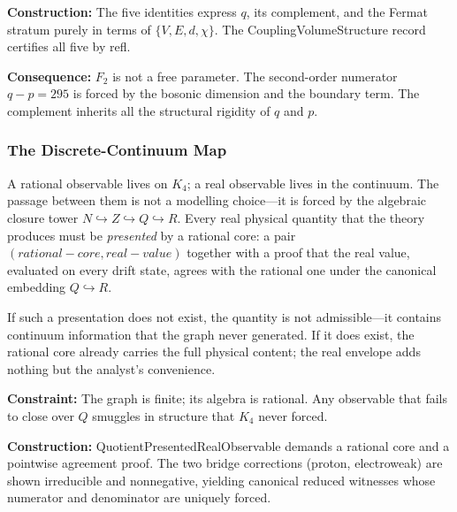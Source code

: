 \documentclass[11pt,a4paper]{book}
\def\mathbb#1{#1}%
\def\texttt#1{#1}%
\begin{document}
\textbf{Construction:}
The five identities express $q$, its complement, and the Fermat
stratum purely in terms of $\{V, E, d, \chi\}$.  The
\texttt{CouplingVolumeStructure} record certifies all five by
\texttt{refl}.

\textbf{Consequence:}
$F_2$ is not a free parameter.  The second-order numerator $q - p = 295$
is forced by the bosonic dimension and the boundary term.
The complement inherits all the structural rigidity of $q$ and $p$.


\subsubsection*{The Discrete-Continuum Map}

A rational observable lives on $K_4$; a real observable lives in the continuum.
The passage between them is not a modelling choice---it is forced by the
algebraic closure tower $\mathbb{N} \hookrightarrow \mathbb{Z}
\hookrightarrow \mathbb{Q} \hookrightarrow \mathbb{R}$.  Every real physical
quantity that the theory produces must be \emph{presented} by a rational core:
a pair $(\texttt{rational-core}, \texttt{real-value})$ together with a proof
that the real value, evaluated on every drift state, agrees with the rational
one under the canonical embedding $\mathbb{Q} \hookrightarrow \mathbb{R}$.

If such a presentation does not exist, the quantity is not admissible---it
contains continuum information that the graph never generated.  If it does
exist, the rational core already carries the full physical content; the real
envelope adds nothing but the analyst's convenience.

\medskip
\noindent
\textbf{Constraint:}
The graph is finite; its algebra is rational.  Any observable that fails to
close over $\mathbb{Q}$ smuggles in structure that $K_4$ never forced.

\noindent
\textbf{Construction:}
\texttt{QuotientPresentedRealObservable} demands a rational core and a
pointwise agreement proof.  The two bridge corrections (proton, electroweak)
are shown irreducible and nonnegative, yielding canonical reduced witnesses
whose numerator and denominator are uniquely forced.
\end{document}

